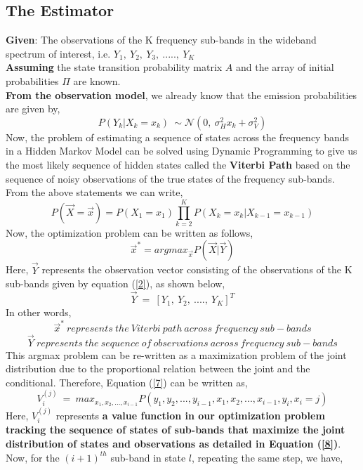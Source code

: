 \documentclass[12pt, draftcls, onecolumn]{IEEEtran}
\begin{document}
\subsection{The Estimator}
\textbf{Given}: The observations of the K frequency sub-bands in the wideband spectrum of interest, i.e. $Y_1,\ Y_2,\ Y_3,\ .....,\ Y_K$
\\\textbf{Assuming} the state transition probability matrix $A$ and the array of initial probabilities $\Pi$ are known.
\\\textbf{From the observation model}, we already know that the emission probabilities are given by,
\[P(Y_k|X_k = x_k)\ \sim \mathcal{N}(0,\ \sigma_H^2x_k+\sigma_V^2)\]
Now, the problem of estimating a sequence of states across the frequency bands in a Hidden Markov Model can be solved using Dynamic Programming to give us the most likely sequence of hidden states called the \textbf{Viterbi Path} based on the sequence of noisy observations of the true states of the frequency sub-bands.
\\From the above statements we can write,
\begin{equation*}
    P(\vec{X}=\vec{x}) = P(X_1=x_1) \prod_{k=2}^{K} P(X_k=x_k|X_{k-1}=x_{k-1})
\end{equation*}
Now, the optimization problem can be written as follows,
\begin{equation}\label{7}
    \vec{x}^* = argmax_{\vec{x}} P(\vec{X}|\vec{Y})
\end{equation}
Here,
$\vec{Y}$ represents the observation vector consisting of the observations of the K sub-bands given by equation (\ref{2}), as shown below,
\[\vec{Y}\ =\ [{Y}_1,\ {Y}_2,\ ....,\ {Y}_K]^T\]
In other words,
\[\vec{x}^*\ represents\ the\ Viterbi\ path\ across\ frequency\ sub-bands\]
\[\vec{Y}\ represents\ the\ sequence\ of\ observations\ across\ frequency\ sub-bands\]
This argmax problem can be re-written as a maximization problem of the joint distribution due to the proportional relation between the joint and the conditional. Therefore, Equation (\ref{7}) can be written as,
\begin{equation}\label{8}
    V_{i}^{(j)}\ =\ max_{x_1,x_2,...,x_{i-1}}P(y_1,y_2,...,y_{i-1},x_1,x_2,...,x_{i-1},y_i,x_{i}=j)
\end{equation}
Here, $V_{i}^{(j)}$ represents \textbf{a value function in our optimization problem tracking the sequence of states of sub-bands that maximize the joint distribution of states and observations as detailed in Equation (\ref{8})}.
\\Now, for the $(i+1)^{th}$ sub-band in state $l$, repeating the same step, we have,
\end{document}
